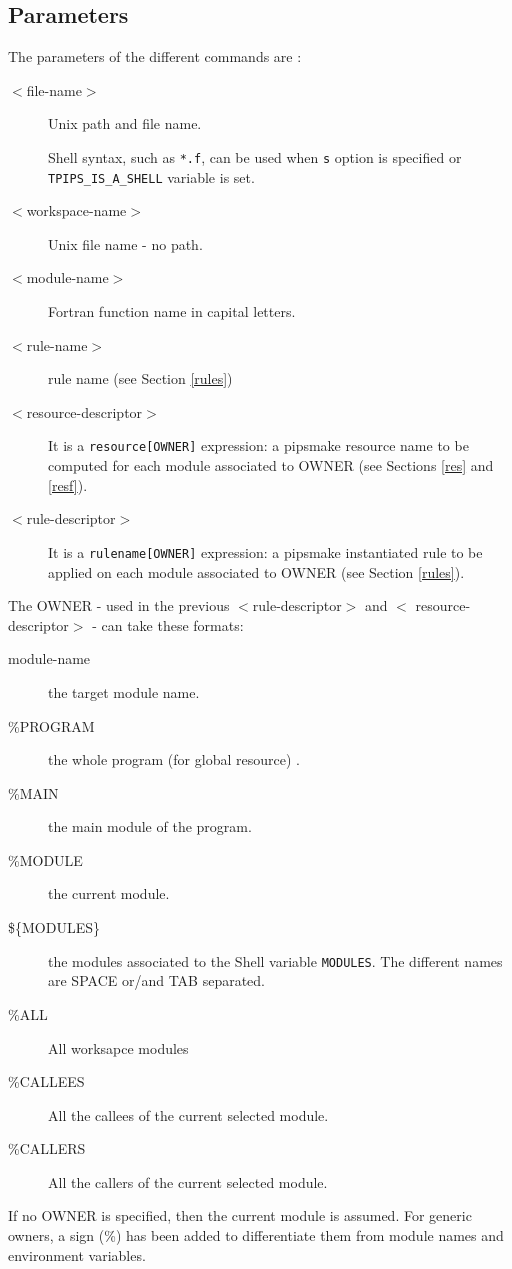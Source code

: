 \documentclass[a4paper,12pt]{article}
\begin{document}
\subsection{Parameters}
The parameters of the different commands are :
\begin{description}
\item [$<$file-name$>$] Unix path and file name. 
  \par Shell syntax, such as \verb+*.f+, can be used when 
  \verb+s+ option is specified or \verb+TPIPS_IS_A_SHELL+ variable is set.
          
\item [$<$workspace-name$>$] Unix file name - no path.
  
\item [$<$module-name$>$] Fortran function name in capital letters.
  
\item [$<$rule-name$>$] rule name (see Section \ref{rules})
          
\item [$<$resource-descriptor$>$] It is a \verb+resource[OWNER]+
  expression: a pipsmake resource name to be computed for each module
  associated to OWNER (see Sections \ref{res} and \ref{resf}).
  
\item [$<$rule-descriptor$>$] It is a \verb+rulename[OWNER]+ expression: a  pipsmake instantiated
  rule  to be applied  on each  module associated to OWNER (see Section \ref{rules}).


\end{description}

The OWNER - used in the previous $<$rule-descriptor$>$ and
$<$ resource-descriptor$>$ - can take these formats:

\begin{description}
\item [module-name] the target module name.
\item [\%PROGRAM] the whole program (for global resource) . 
\item [\%MAIN] the main module of the program. 
\item [\%MODULE] the current  module.
\item [\$\{MODULES\}] the modules associated to the Shell variable
  {\tt MODULES}. The different names are SPACE or/and TAB separated.
\item [\%ALL] All worksapce modules 
\item [\%CALLEES] All the callees of the current selected  module.
\item [\%CALLERS]  All  the callers of the current selected  module.

\end{description}
If no OWNER is specified, then the current  module is assumed. For
generic owners, a  sign (\%) has been added to differentiate them
from module names and environment variables.
\end{document}
